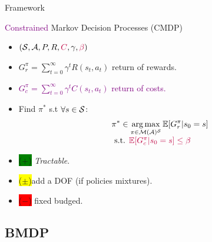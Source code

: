 \documentclass{beamer}
\newcommand{\cplus}{\colorbox{green}{($+$)} }
\newcommand{\cmoins}{\colorbox{red}{($-$)} }
\newcommand{\cmean}{\colorbox{yellow}{($\pm$)}}
\begin{document}
    \begin{frame}{Framework}

        \begin{block}{\textcolor{purple}{Constrained} Markov Decision Processes (CMDP)}
            \begin{itemize}
                \item $(\mathcal{S}, \mathcal{A}, P, R,\textcolor{purple}{C}, \gamma,\textcolor{purple}{\beta})$
                \item $G_r^\pi = \sum_{t=0}^\infty \gamma^t R(s_t, a_t)$ return of rewards.
                \item \textcolor{purple}{ $G_c^\pi = \sum_{t=0}^\infty \gamma^t C(s_t, a_t)$ return of costs.}
                \item Find $\pi^*$ s.t $\forall s\in\mathcal{S}$:
                \begin{equation}
                    \label{eq:cmdp}
                    \begin{array}{lcr}
                        \displaystyle \pi^* \in \operatorname*{arg\,max}_{\pi\in\mathcal{M}(\mathcal{A})^{\mathcal{S}}} \operatorname*{\mathbb{E}}[G_r^\pi | s_0=s] \\
                        \text{ s.t. }  \textcolor{purple}{\operatorname*{\mathbb{E}}[G_c^\pi | s_0=s] \leq \beta}
                    \end{array}
                \end{equation}
            \end{itemize}
        \end{block}

        \begin{block}{}
            \begin{itemize}
                \item \cplus \textit{Tractable}.
                \item \cmean add a DOF (if policies mixtures).%
                \item \cmoins fixed budged.


            \end{itemize}
        \end{block}

    \end{frame}

    \subsection{BMDP}
\end{document}
